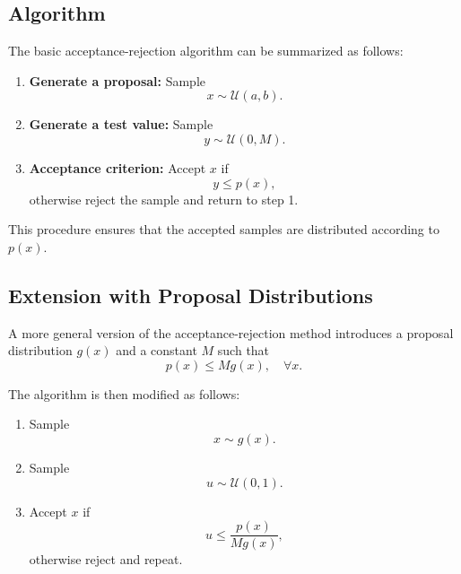 \documentclass[letterpaper,10pt]{article}
\begin{document}
\subsection{Algorithm}

The basic acceptance-rejection algorithm can be summarized as follows:

\begin{enumerate}
    \item \textbf{Generate a proposal:} Sample 
    \begin{equation}
        x \sim \mathcal{U}(a,b).
    \end{equation}
    
    \item \textbf{Generate a test value:} Sample 
    \begin{equation}
        y \sim \mathcal{U}(0,M).
    \end{equation}
    
    \item \textbf{Acceptance criterion:} Accept $x$ if
    \begin{equation}
        y \leq p(x),
    \end{equation}
    otherwise reject the sample and return to step 1.
\end{enumerate}

This procedure ensures that the accepted samples are distributed according to $p(x)$.

\subsection{Extension with Proposal Distributions}

A more general version of the acceptance-rejection method introduces a proposal distribution $g(x)$ and a constant $M$ such that
\begin{equation}
    p(x) \leq M g(x), \quad \forall x.
\end{equation}

The algorithm is then modified as follows:

\begin{enumerate}
    \item Sample 
    \begin{equation}
        x \sim g(x).
    \end{equation}
    
    \item Sample 
    \begin{equation}
        u \sim \mathcal{U}(0,1).
    \end{equation}
    
    \item Accept $x$ if
    \begin{equation}
        u \leq \frac{p(x)}{M g(x)},
    \end{equation}
    otherwise reject and repeat.
\end{enumerate}
\end{document}
